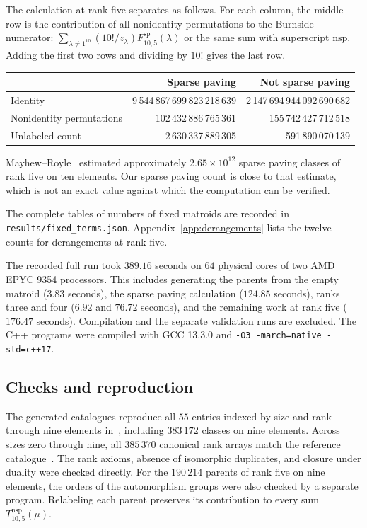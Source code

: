 \documentclass[11pt]{article}
\theoremstyle{definition}
\newcommand{\SP}{\mathrm{sp}}
\newcommand{\nsp}{\mathrm{nsp}}
\newcommand{\uSparse}{2\,630\,337\,889\,305}
\newcommand{\uNonSparse}{591\,890\,070\,139}
\begin{document}
The calculation at rank five separates as follows. For each column, the
middle row is the contribution of all nonidentity permutations to the
Burnside numerator:
$\sum_{\lambda\ne1^{10}}(10!/z_\lambda)F^{\SP}_{10,5}(\lambda)$ or
the same sum with superscript $\nsp$. Adding the first two rows and
dividing by $10!$ gives the last row.
\begin{center}
\small
\begin{tabular}{@{}lrr@{}}
\toprule
 & Sparse paving & Not sparse paving\\
\midrule
Identity
 & 9\,544\,867\,699\,823\,218\,639
 & 2\,147\,694\,944\,092\,690\,682\\
Nonidentity permutations
 & 102\,432\,886\,765\,361 & 155\,742\,427\,712\,518\\
Unlabeled count & \uSparse & \uNonSparse\\
\bottomrule
\end{tabular}
\end{center}
Mayhew--Royle~\cite[Section 9.2]{MR} estimated approximately
$2.65\times10^{12}$ sparse paving classes of rank five on ten elements.
Our sparse paving count is close to that estimate, which is not an exact
value against which the computation can be verified.

The complete tables of numbers of fixed matroids are recorded in
\texttt{results/fixed\_terms.json}. Appendix~\ref{app:derangements} lists
the twelve counts for derangements at rank five.

The recorded full run took $389.16$ seconds on $64$ physical cores of two
AMD EPYC 9354 processors. This includes generating the parents from the
empty matroid ($3.83$ seconds), the sparse paving calculation ($124.85$
seconds), ranks three and four ($6.92$ and $76.72$ seconds), and the
remaining work at rank five ($176.47$ seconds). Compilation and the separate
validation runs are excluded. The C++ programs were compiled with GCC
13.3.0 and \texttt{-O3 -march=native -std=c++17}.

\subsection{Checks and reproduction}

The generated catalogues reproduce all $55$ entries indexed by size and rank through
nine elements in~\cite{MR}, including $383\,172$ classes on nine elements.
Across sizes zero through nine, all $385\,370$ canonical rank arrays match
the reference catalogue~\cite{Catalogue}. The rank axioms, absence of
isomorphic duplicates, and closure under duality were checked directly.
For the $190\,214$ parents of rank five on nine elements, the orders of the
automorphism groups were also checked by a separate program. Relabeling
each parent preserves its contribution to every sum $T^{\nsp}_{10,5}(\mu)$.
\end{document}

